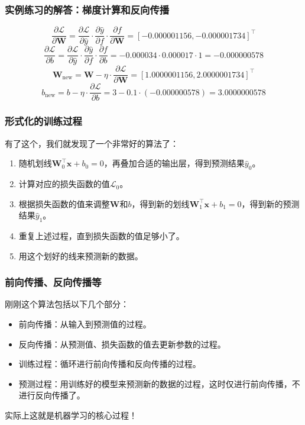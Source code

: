 \documentclass{ctexbeamer}
\begin{document}
\begin{frame}
    \frametitle{实例练习的解答：梯度计算和反向传播}

    \[\frac{\partial \mathcal{L}}{\partial \mathbf{W}} = \frac{\partial \mathcal{L}}{\partial \hat{y}} \cdot \frac{\partial \hat{y}}{\partial f} \cdot \frac{\partial f}{\partial \mathbf{W}} = [-0.000001156, -0.000001734]^\top\]
    \[\frac{\partial \mathcal{L}}{\partial b} = \frac{\partial \mathcal{L}}{\partial \hat{y}} \cdot \frac{\partial \hat{y}}{\partial f} \cdot \frac{\partial f}{\partial b} = -0.000034 \cdot 0.000017 \cdot 1 = -0.000000578\]
    \[\mathbf{W}_\text{new} = \mathbf{W} - \eta \cdot \frac{\partial \mathcal{L}}{\partial \mathbf{W}}  = [1.0000001156, 2.0000001734]^\top\]
    \[b_\text{new} = b - \eta \cdot \frac{\partial \mathcal{L}}{\partial b} = 3 - 0.1 \cdot (-0.000000578) = 3.0000000578\]

\end{frame}

\begin{frame}
    \frametitle{形式化的训练过程}

    有了这个，我们就发现了一个非常好的算法了：
    \begin{enumerate}
        \item 随机划线$\mathbf{W}^\top_0 \mathbf{x} + b_0 = 0$，再叠加合适的输出层，得到预测结果$\hat{y}_0$。
        \item 计算对应的损失函数的值$\mathcal{L}_0$。
        \item 根据损失函数的值来调整$\mathbf{W}$和$b$，得到新的划线$\mathbf{W}^\top_1 \mathbf{x} + b_1 = 0$，得到新的预测结果$\hat{y}_1$。
        \item 重复上述过程，直到损失函数的值足够小了。
        \item 用这个划好的线来预测新的数据。
    \end{enumerate}

\end{frame}

\begin{frame}
    \frametitle{前向传播、反向传播等}

    刚刚这个算法包括以下几个部分：
    \begin{itemize}
        \item 前向传播：从输入到预测值的过程。
        \item 反向传播：从预测值、损失函数的值去更新参数的过程。
        \item 训练过程：循环进行前向传播和反向传播的过程。
        \item 预测过程：用训练好的模型来预测新的数据的过程，这时仅进行前向传播，不进行反向传播了。
    \end{itemize}

    实际上这就是机器学习的核心过程！

\end{frame}
\end{document}
